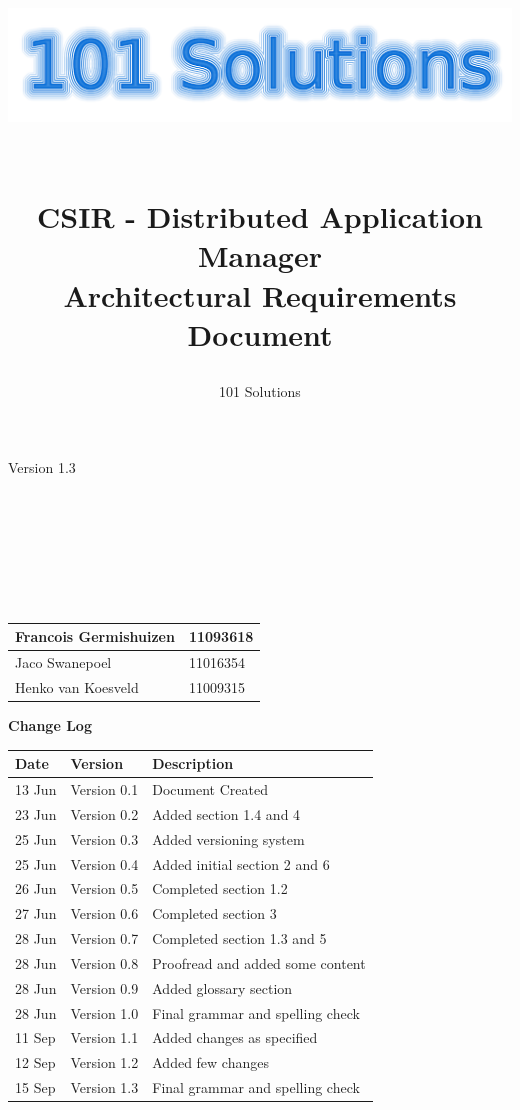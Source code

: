 \documentclass[a4paper,12pt,final]{article}
\title{
\begin{center}
  	\includegraphics[scale=0.3]{101Logo.png} 
  \end{center}
  \textbf{\\}
CSIR - Distributed Application Manager\\
Architectural Requirements Document\\
}
\author{101 Solutions}
\begin{document}
\maketitle
\begin{center}
Version 1.3
\end{center}
\textbf{\\}
\textbf{\\}
\textbf{\\}
\textbf{\\}
\textbf{\\}
\textbf{\\}
\begin{center}
\begin{tabular}{|l|l|}
\hline
Francois Germishuizen & 11093618\\
\hline
Jaco Swanepoel & 11016354\\
\hline
Henko van Koesveld & 11009315\\
\hline
\end{tabular}
\end{center}
\thispagestyle{empty}
\newpage
\thispagestyle{empty}
\textbf{\large{Change Log}}
\vspace{6pt}\newline
\begin{tabular}{|l|l|l|}
\hline
Date & Version & Description\\
\hline
13 Jun & Version 0.1 & Document Created\\
\hline
23 Jun & Version 0.2 & Added section 1.4 and 4\\
\hline
25 Jun & Version 0.3 & Added versioning system\\
\hline
25 Jun & Version 0.4 & Added initial section 2 and 6\\
\hline
26 Jun & Version 0.5 & Completed section 1.2\\
\hline
27 Jun & Version 0.6 & Completed section 3\\
\hline
28 Jun & Version 0.7 & Completed section 1.3 and 5\\
\hline
28 Jun & Version 0.8 & Proofread and added some content\\
\hline
28 Jun & Version 0.9 & Added glossary section\\
\hline
28 Jun & Version 1.0 & Final grammar and spelling check\\
\hline
11 Sep & Version 1.1 & Added changes as specified\\
\hline
12 Sep & Version 1.2 & Added few changes\\
\hline
15 Sep & Version 1.3 & Final grammar and spelling check\\
\hline
\end{tabular}
\newpage
\tableofcontents
\thispagestyle{empty}
\newpage
\end{document}
